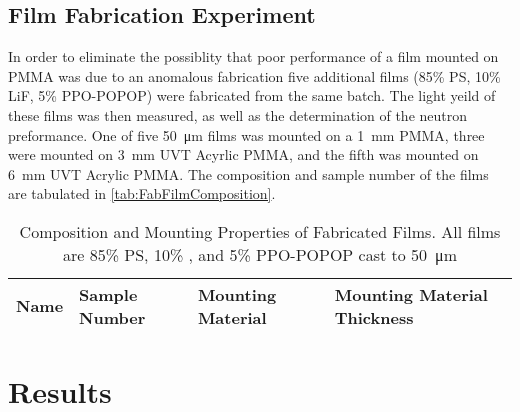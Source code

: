 \documentclass[draftcls,onecolumn]{IEEEtran}
\begin{document}
\subsection{Film Fabrication Experiment}
In order to eliminate the possiblity that poor performance of a film mounted on PMMA was due to an anomalous fabrication five additional films (85\% PS, 10\% LiF, 5\% PPO-POPOP) were fabricated from the same batch.
The light yeild of these films was then measured, as well as the determination of the neutron preformance.
One of five \SI{50}{\um} films was mounted on a \SI{1}{\mm} PMMA, three were mounted on \SI{3}{\mm} UVT Acyrlic PMMA, and the fifth was mounted on \SI{6}{\mm} UVT Acrylic PMMA.
The composition and sample number of the films are tabulated in \autoref{tab:FabFilmComposition}.
\begin{table}
	\centering
	\caption[Fabricated PS Films]{Composition and Mounting Properties of Fabricated Films. All films are 85\% PS, 10\% , and 5\% PPO-POPOP cast to \SI{50}{\um}}
	\label{tab:FabFilmComposition}
  \begin{tabular}{p{5.5cm} | m{1cm} m{2.5cm} m{3cm}}
  \toprule
  Name&Sample Number&Mounting Material& Mounting Material Thickness\\
  \midrule
  \bottomrule
  \end{tabular}
\end{table}
\section{Results}
\end{document}
